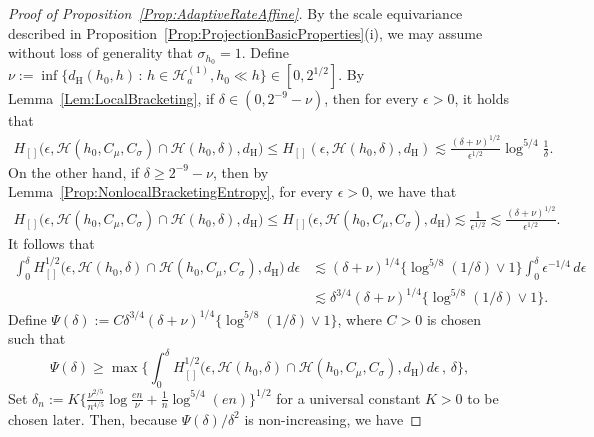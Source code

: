 \documentclass[a4paper,12pt]{article}
\begin{document}
\begin{proof}[Proof of Proposition~\ref{Prop:AdaptiveRateAffine}]
By the scale equivariance described in Proposition~\ref{Prop:ProjectionBasicProperties}(i), we may assume without loss of generality that $\sigma_{h_0} = 1$.  Define $\nu := \inf \bigl\{ d_{\mathrm{H}}(h_0, h) \,:\, h \in \mathcal{H}_{a}^{(1)}, h_0 \ll h \bigr\} \in [0,2^{1/2}]$. By Lemma~\ref{Lem:LocalBracketing}, if $\delta \in (0, 2^{-9}-\nu)$, then for every $\epsilon > 0$, it holds that 
\begin{align*}
  H_{[]}\bigl(\epsilon, \mathcal{H}(h_0, C_\mu, C_\sigma) \cap \mathcal{H}(h_0, \delta), d_{\mathrm{H}}\bigr) 
  \leq  H_{[]}(\epsilon, \mathcal{H}(h_0, \delta), d_{\mathrm{H}}) \lesssim \frac{(\delta + \nu)^{1/2}}{\epsilon^{1/2}} \log^{5/4} \frac{1}{\delta}.
\end{align*}
On the other hand, if $\delta \geq 2^{-9} - \nu$, then by Lemma~\ref{Prop:NonlocalBracketingEntropy}, for every $\epsilon > 0$, we have that 
\begin{align*}
    H_{[]}\bigl(\epsilon, \mathcal{H}(h_0, C_\mu, C_\sigma) \cap \mathcal{H}(h_0, \delta), d_{\mathrm{H}}\bigr) \leq  H_{[]}\bigl(\epsilon, \mathcal{H}(h_0, C_\mu, C_\sigma), d_{\mathrm{H}}\bigr) \lesssim \frac{1}{\epsilon^{1/2}} \lesssim \frac{(\delta + \nu)^{1/2}}{\epsilon^{1/2}}.
\end{align*}
It follows that 
\begin{align*}
  \int_0^\delta H_{[]}^{1/2}\bigl(\epsilon, \mathcal{H}(h_0, \delta) \cap
    \mathcal{H}(h_0, C_\mu, C_\sigma), d_{\mathrm{H}}\bigr) \, d\epsilon &\lesssim (\delta+\nu)^{1/4}
    \bigl\{ \log^{5/8} (1/\delta) \vee 1 \bigr\}
    \int_0^{\delta} \epsilon^{-1/4} \, d\epsilon \\
  &\lesssim \delta^{3/4} (\delta+\nu)^{1/4} \bigl\{ \log^{5/8} (1/\delta) \vee 1 \bigr\}.
\end{align*}
Define $\Psi(\delta) :=  C \delta^{3/4} (\delta+\nu)^{1/4}\{ \log^{5/8} (1/\delta) \vee 1\}$, where $C > 0$ is chosen such that 
\[
\Psi(\delta) \geq \max\biggl\{\int_0^\delta H_{[]}^{1/2}\bigl(\epsilon, \mathcal{H}(h_0, \delta) \cap
    \mathcal{H}(h_0, C_\mu, C_\sigma), d_{\mathrm{H}}\bigr) \, d\epsilon \, , \, \delta\biggr\},
\]
Set $\delta_n := K\bigl\{\frac{\nu^{2/5}}{n^{4/5}} \log \frac{en}{\nu} + \frac{1}{n} \log^{5/4}(en)\bigr\}^{1/2}$ for a universal constant $K > 0$ to be chosen later.  Then, because $\Psi(\delta)/\delta^2$ is non-increasing, we have

\end{proof}
\end{document}
